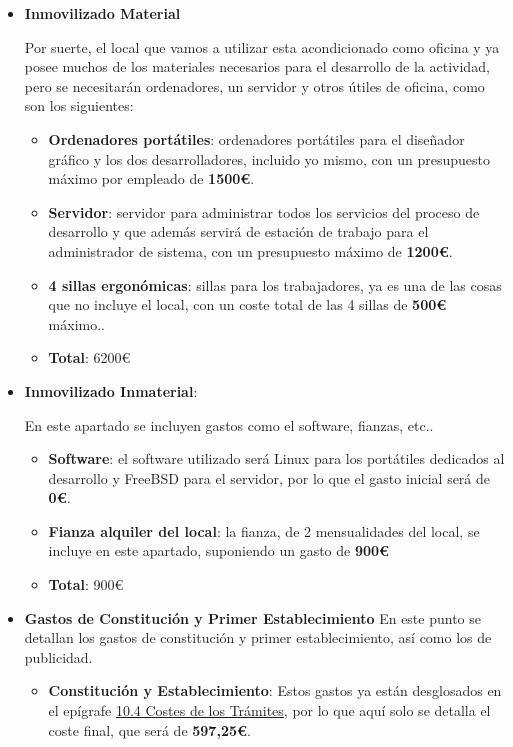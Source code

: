 \begin{itemize}
    \item \textbf{Inmovilizado Material}

    Por suerte, el local que vamos a utilizar esta acondicionado como oficina y ya posee muchos de los materiales necesarios para el
    desarrollo de la actividad, pero se necesitarán ordenadores, un servidor y otros útiles de oficina, como son los siguientes:
    \begin{itemize}
        \item \textbf{Ordenadores portátiles}: ordenadores portátiles para el diseñador gráfico y los dos desarrolladores, incluido yo mismo, con un presupuesto máximo por empleado de \textbf{1500€}.
        \item \textbf{Servidor}: servidor para administrar todos los servicios del proceso de desarrollo y que además servirá de estación de trabajo para el administrador de sistema, con un presupuesto máximo de \textbf{1200€}.
        \item \textbf{4 sillas ergonómicas}: sillas para los trabajadores, ya es una de las cosas que no incluye el local, con un coste total de las 4 sillas de \textbf{500€} máximo..

        \item \textbf{Total}: 6200€
    \end{itemize}
    \item \textbf{Inmovilizado Inmaterial}:


    En este apartado se incluyen gastos como el software, fianzas, etc..
    \begin{itemize}
          \item \textbf{Software}: el software utilizado será Linux para los portátiles dedicados al desarrollo y FreeBSD para el servidor, por lo que el gasto inicial será de \textbf{0€}.
          \item \textbf{Fianza alquiler del local}: la fianza, de 2 mensualidades del local, se incluye en este apartado, suponiendo un gasto de \textbf{900€}

          \item \textbf{Total}: 900€
    \end{itemize}

    \item \textbf{Gastos de Constitución y Primer Establecimiento}
    En este punto se detallan los gastos de constitución y primer establecimiento, así como los de publicidad.
    \begin{itemize}
        \item \textbf{Constitución y Establecimiento}: Estos gastos ya están desglosados en el epígrafe \hyperref[sec:costetramites]{10.4 Costes de los Trámites}, por lo que aquí solo se detalla el coste final, que será de \textbf{597,25€}.


\end{itemize}
\end{itemize}
